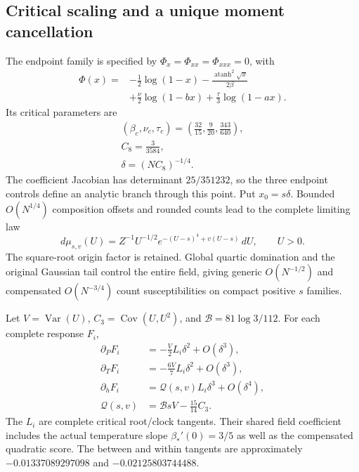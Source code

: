 \subsection{Critical scaling and a unique moment cancellation}

The endpoint family is specified by $\Phi_x=\Phi_{xx}=\Phi_{xxx}=0$, with
\begin{equation}
\begin{aligned}
 \Phi(x)={}&-\frac12\log(1-x)
 -\frac{\operatorname{atanh}^2\sqrt{x}}{2\beta}\\
 &+\frac{\nu}{2}\log(1-bx)+\frac{\tau}{3}\log(1-ax).
\end{aligned}
\end{equation}
Its critical parameters are
\begin{equation}
\begin{gathered}
(\beta_c,\nu_c,\tau_c)=
 \left(\frac{32}{15},\frac9{20},\frac{343}{640}\right),\\
C_8=\frac3{3584},\\
\delta=(NC_8)^{-1/4}.
\end{gathered}
\end{equation}
The coefficient Jacobian has determinant $25/351232$, so the three endpoint controls define an analytic branch through this point. Put $x_0=s\delta$. Bounded $O(N^{1/4})$ composition offsets and rounded counts lead to the complete limiting law
\begin{equation}
 d\mu_{s,v}(U)=Z^{-1}U^{-1/2}
 e^{-(U-s)^4+v(U-s)}\,dU,\qquad U>0.
\end{equation}
The square-root origin factor is retained. Global quartic domination and the original Gaussian tail control the entire field, giving generic $O(N^{-1/2})$ and compensated $O(N^{-3/4})$ count susceptibilities on compact positive $s$ families.

Let $V=\operatorname{Var}(U)$, $C_3=\operatorname{Cov}(U,U^2)$, and $\mathcal B=81\log3/112$. For each complete response $F_i$,
\begin{align}
 \partial_PF_i&=-\frac V2L_i\delta^2+O(\delta^3),\\
 \partial_TF_i&=-\frac{6V}{7}L_i\delta^2+O(\delta^3),\\
 \partial_hF_i&=\mathcal Q(s,v)L_i\delta^3+O(\delta^4),\\
 \mathcal Q(s,v)&=\mathcal B sV-\frac{15}{14}C_3.
\end{align}
The $L_i$ are complete critical root/clock tangents. Their shared field coefficient includes the actual temperature slope $\beta_*'(0)=3/5$ as well as the compensated quadratic score. The between and within tangents are approximately $-0.01337089297098$ and $-0.02125803744488$.

